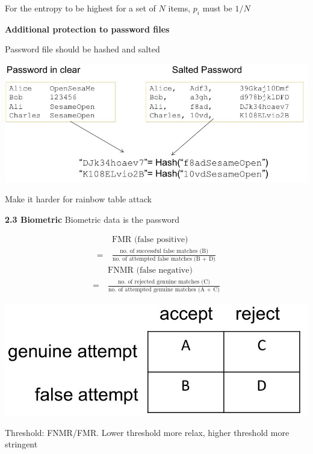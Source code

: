 \documentclass[landscape,a4paper]{extarticle}
\newenvironment{Figure}
  {\par\noindent\minipage{\linewidth}}
  {\endminipage\par\medskip}
\begin{document}
\begin{multicols*}{5}
    For the entropy to be highest for a set of $N$ items, $p_i$ must be $1/N$

    \textbf{Additional protection to password files}

    Password file should be hashed and salted
    \begin{Figure}
        \centering
        \includegraphics[width=\linewidth]{hashed_salted.jpg}        
    \end{Figure}

    Make it harder for rainbow table attack

    \textbf{2.3 Biometric}
    Biometric data is the password

    \begin{align*}
        &\text{FMR (false positive)}\\
       =\ &\frac{\text{no. of successful false matches (B)}}{\text{no. of attempted false matches (B + D)}}
    \end{align*}
    \vspace{1px}
    \begin{align*}
        &\text{FNMR (false negative)}\\
       =\ &\frac{\text{no. of rejected genuine matches (C)}}{\text{no. of attempted genuine matches (A + C)}}
    \end{align*}
    \begin{Figure}
        \centering
        \includegraphics[width=0.8\linewidth]{fmr_fnmr.jpg}        
    \end{Figure}
    Threshold: FNMR/FMR. Lower threshold more relax, higher threshold more stringent


\end{multicols*}
\end{document}
